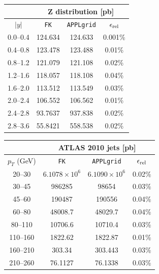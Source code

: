\begin{table}[ht!]
\begin{center}
 \vspace{2mm}
 
 \begin{tabular}{c|c|c|c|}
 \cline{2-4}
   & \multicolumn{3}{|c|}{Z distribution [pb]}  \\
    \hline
\multicolumn{1}{|c||}{$|y|$} & {\tt FK}	  &    {\tt APPLgrid}  &   $\epsilon_{\rm rel}$\\
\hline
\multicolumn{1}{|c||}{0.0--0.4} & 124.634 & 124.633 & 0.001\%\\
\multicolumn{1}{|c||}{0.4--0.8} & 123.478 & 123.488 & 0.01\%\\
\multicolumn{1}{|c||}{0.8--1.2} & 121.079 & 121.108 & 0.02\%\\
\multicolumn{1}{|c||}{1.2--1.6} & 118.057 & 118.108 & 0.04\%\\
\multicolumn{1}{|c||}{1.6--2.0} & 113.512 & 113.549 & 0.03\%\\
\multicolumn{1}{|c||}{2.0--2.4} & 106.552 & 106.562 & 0.01\%\\
\multicolumn{1}{|c||}{2.4--2.8} & 93.7637 & 937.838 & 0.02\%\\
\multicolumn{1}{|c||}{2.8--3.6} & 55.8421 & 558.538 & 0.02\%\\
\hline
 \end{tabular}
 
  \vspace{2mm}
  
\begin{tabular}{c|c|c|c|}
\cline{2-4}
   & \multicolumn{3}{|c|}{ATLAS 2010 jets [pb]}  \\
    \hline
\multicolumn{1}{|c||}{$p_T$ (GeV)} & {\tt FK}	  &    {\tt APPLgrid}  &    $\epsilon_{\rm rel}$ \\
\hline
\multicolumn{1}{|c||}{20--30}   & $6.1078 \times 10^6$ & $6.1090 \times 10^6$ &	0.02\% \\
\multicolumn{1}{|c||}{30--45}   & 986285 	                     & 98654      & 0.03\% \\
\multicolumn{1}{|c||}{45--60}   & 190487 	                     & 190556    & 0.04\% \\
\multicolumn{1}{|c||}{60--80}   & 48008.7 	                     & 48029.7   & 0.04\% \\
\multicolumn{1}{|c||}{80--110} & 10706.6 	                     & 10710.4   & 0.03\% \\
\multicolumn{1}{|c||}{110--160} & 1822.62 			  & 1822.87   & 0.01\% \\
\multicolumn{1}{|c||}{160--210} & 303.34 			  & 303.443   & 0.03\% \\
\multicolumn{1}{|c||}{210--260} & 76.1127 			  & 76.1338   & 0.03\% \\
\hline
 \end{tabular}


\end{center}
\end{table}
